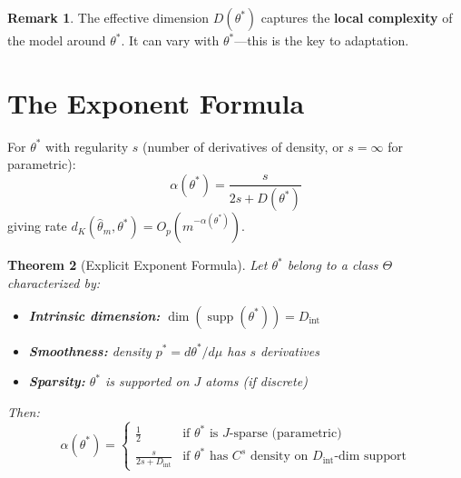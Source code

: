 \documentclass[11pt]{article}
\newtheorem{theorem}{Theorem}[section]
\theoremstyle{definition}
\newtheorem{remark}[theorem]{Remark}
\DeclareMathOperator{\supp}{supp}
\begin{document}
\begin{remark}
The effective dimension $D(\theta^*)$ captures the \textbf{local complexity} of the model around $\theta^*$. It can vary with $\theta^*$---this is the key to adaptation.
\end{remark}

\section{The Exponent Formula}

\begin{tcolorbox}[colback=green!5!white, colframe=green!50!black, title=Rate Exponent]
For $\theta^*$ with regularity $s$ (number of derivatives of density, or $s = \infty$ for parametric):
\begin{equation}
    \boxed{
    \alpha(\theta^*) = \frac{s}{2s + D(\theta^*)}
    }
\end{equation}
giving rate $d_K(\hat{\theta}_m, \theta^*) = O_p(m^{-\alpha(\theta^*)})$.
\end{tcolorbox}

\begin{theorem}[Explicit Exponent Formula]
\label{thm:exponent}
Let $\theta^*$ belong to a class $\Theta$ characterized by:
\begin{itemize}
    \item \textbf{Intrinsic dimension:} $\dim(\supp(\theta^*)) = D_{\mathrm{int}}$
    \item \textbf{Smoothness:} density $p^* = d\theta^*/d\mu$ has $s$ derivatives
    \item \textbf{Sparsity:} $\theta^*$ is supported on $J$ atoms (if discrete)
\end{itemize}
Then:
\begin{equation}
    \alpha(\theta^*) = \begin{cases}
        \displaystyle \frac{1}{2} & \text{if } \theta^* \text{ is } J\text{-sparse (parametric)} \\[1.5em]
        \displaystyle \frac{s}{2s + D_{\mathrm{int}}} & \text{if } \theta^* \text{ has } C^s \text{ density on } D_{\mathrm{int}}\text{-dim support}
    \end{cases}
\end{equation}
\end{theorem}

\end{document}
